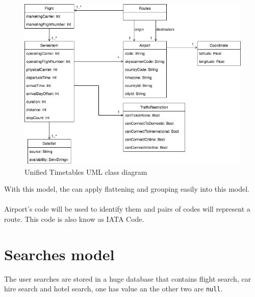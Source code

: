 \begin{figure}[H]
\centering
\includegraphics[scale=0.6]{diagrams/unified_model.png}
\caption{Unified Timetables UML class diagram}
\label{unified-uml}
\end{figure}

With this model, the  can apply flattening and grouping easily into this model.
\\\\
Airport's code will be used to identify them and pairs of codes will represent a route. This code is also know as IATA Code\cite{iata_code}.


\section{Searches model}

The user searches are stored in a huge database that contains flight search, car hire search and hotel search, one has value an the other two are \texttt{null}.

